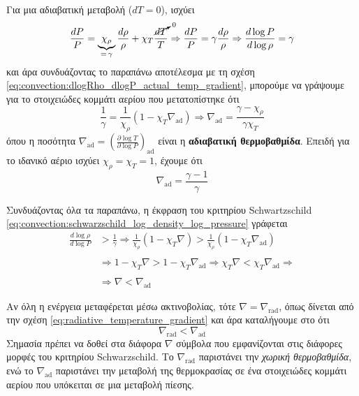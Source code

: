 Για μια αδιαβατική μεταβολή ($dT = 0$), ισχύει 
\begin{equation}
    \frac{dP}{P} = \underbrace{\chi_\rho}_{= \,\gamma} \frac{d\rho}{\rho} + \chi_T \frac{\cancelto{0}{dT}}{T} \Rightarrow \frac{dP}{P} = \gamma \frac{d\rho}{\rho} \Rightarrow \frac{d\log P}{d\log \rho} = \gamma 
\end{equation}
και άρα συνδυάζοντας το παραπάνω αποτέλεσμα με τη σχέση \eqref{eq:convection:dlogRho_dlogP_actual_temp_gradient}, μπορούμε να γράψουμε για το στοιχειώδες κομμάτι αερίου που μετατοπίστηκε ότι
\begin{equation}
    \label{eq:convection:nabla_ad}
    \frac{1}{\gamma} = \frac{1}{\chi_\rho} \left(1 - \chi_T \nabla_{\text{ad}} \right) \Rightarrow \nabla_{\text{ad}} = \frac{\gamma - \chi_\rho}{\gamma \chi_T}
\end{equation}
όπου η ποσότητα $\displaystyle \nabla_{\text{ad}} = \left(\frac{\partial \log T}{\partial \log P} \right)_{\text{ad}}$ είναι η \textbf{αδιαβατική θερμοβαθμίδα}. Επειδή για το ιδανικό αέριο ισχύει $\chi_{\rho} = \chi_T = 1$, έχουμε ότι
\begin{equation}
    \nabla_{\text{ad}} = \frac{\gamma - 1}{\gamma}
\end{equation}

Συνδυάζοντας όλα τα παραπάνω, η έκφραση του κριτηρίου Schwartzschild \eqref{eq:convection:schwarzschild_log_density_log_pressure} γράφεται
\begin{align}
    \label{eq:convection:schwartzscild_criterion_actual_temp_gradient}
    \nonumber \frac{d\log \rho}{d\log P} &> \frac{1}{\gamma} \Rightarrow \frac{1}{\chi_\rho} \left( 1 - \chi_T \nabla \right) > \frac{1}{\chi_\rho} \left(1 - \chi_T \nabla_{\text{ad}} \right) \\\nonumber\\
    \nonumber &\Rightarrow 1 - \chi_T \nabla > 1 - \chi_T \nabla_{\text{ad}} \Rightarrow \chi_T \nabla < \chi_T \nabla_{\text{ad}} \Rightarrow \\\nonumber\\
    &\Rightarrow \boxed{\nabla < \nabla_{\text{ad}}}
\end{align}

Αν όλη η ενέργεια μεταφέρεται μέσω ακτινοβολίας, τότε $\nabla = \nabla_{\text{rad}}$, όπως δίνεται από την σχέση \eqref{eq:radiative_temperature_gradient} και άρα καταλήγουμε στο ότι
\begin{equation}
    \label{eq:convection:schwarzschild_criterion_nabla_rad_nabla_ad}
    \boxed{\nabla_{\text{rad}} < \nabla_{\text{ad}}}
\end{equation}
Σημασία πρέπει να δοθεί στα διάφορα $\nabla$ σύμβολα που εμφανίζονται στις διάφορες μορφές του κριτηρίου Schwarzschild. Το $\nabla_{\text{rad}}$ παριστάνει την \textit{χωρική θερμοβαθμίδα}, ενώ το $\nabla_{\text{ad}}$ παριστάνει την μεταβολή της θερμοκρασίας σε ένα στοιχειώδες κομμάτι αερίου που υπόκειται σε μια μεταβολή πίεσης.

